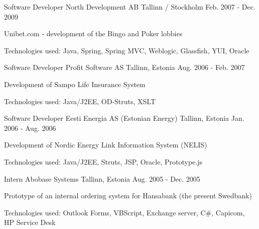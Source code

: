 \begin{cventries}
  \cventry
    {Software Developer}
    {North Development AB}
    {Tallinn / Stockholm}
    {Feb. 2007 - Dec. 2009}
    {
      \begin{cvitems}
        \item { Unibet.com - development of the Bingo and Poker lobbies}
        \item { Technologies used: Java, Spring, Spring MVC, Weblogic, Glassfish, YUI, Oracle }
      \end{cvitems}
    }

  \cventry
    {Software Developer}
    {Profit Software AS}
    {Tallinn, Estonia}
    {Aug. 2006 - Feb. 2007}
    {
      \begin{cvitems}
        \item { Development of Sampo Life Insurance System}
        \item { Technologies used: Java/J2EE, OD-Struts, XSLT }
      \end{cvitems}
    }

  \cventry
    {Software Developer}
    {Eesti Energia AS (Estonian Energy)}
    {Tallinn, Estonia}
    {Jan. 2006 - Aug. 2006}
    {
      \begin{cvitems}
        \item { Development of Nordic Energy Link Information System (NELIS)}
        \item { Technologies used: Java/J2EE, Struts, JSP, Oracle, Prototype.js }
      \end{cvitems}
    }

  \cventry
    {Intern}
    {Abobase Systems}
    {Tallinn, Estonia}
    {Aug. 2005 - Dec. 2005}
    {
      \begin{cvitems}
        \item { Prototype of an internal ordering system for Hansabank (the present Swedbank)}
        \item { Technologies used: Outlook Forms, VBScript, Exchange server, C\#, Capicom, HP Service Desk }
      \end{cvitems}
    }

\end{cventries}